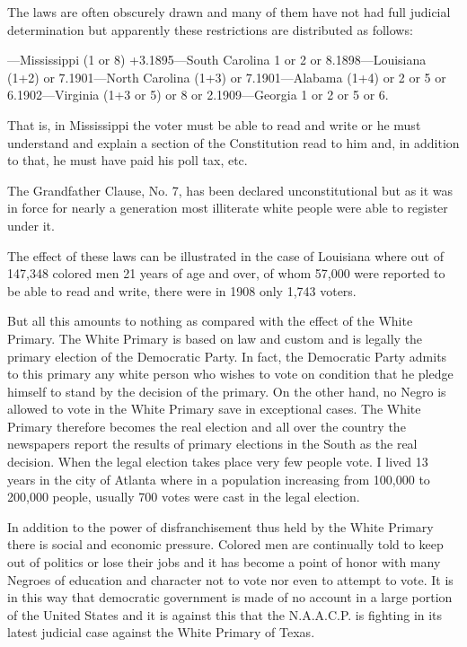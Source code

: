 \documentclass[letterpaper,10pt,english]{jupyterBook}
\begin{document}
\sphinxAtStartPar
The laws are often obscurely drawn and many of them have not had full judicial determination but apparently these restrictions are distributed as follows:

—Mississippi (1 or 8) +3.1895—South Carolina 1 or 2 or 8.1898—Louisiana (1+2) or 7.1901—North Carolina (1+3) or 7.1901—Alabama (1+4) or 2 or 5 or 6.1902—Virginia (1+3 or 5) or 8 or 2.1909—Georgia 1 or 2 or 5 or 6.

\sphinxAtStartPar
That is, in Mississippi the voter must be able to read and write or he must understand and explain a section of the Constitution read to him and, in addition to that, he must have paid his poll tax, etc.

\sphinxAtStartPar
The Grandfather Clause, No. 7, has been declared unconstitutional but as it was in force for nearly a generation most illiterate white people were able to register under it.

\sphinxAtStartPar
The effect of these laws can be illustrated in the case of Louisiana where out of 147,348 colored men 21 years of age and over, of whom 57,000 were reported to be able to read and write, there were in 1908 only 1,743 voters.

\sphinxAtStartPar
But all this amounts to nothing as compared with the effect of the White Primary. The White Primary is based on law and custom and is legally the primary election of the Democratic Party. In fact, the Democratic Party admits to this primary any white person who wishes to vote on condition that he pledge himself to stand by the decision of the primary. On the other hand, no Negro is allowed to vote in the White Primary save in exceptional cases. The White Primary therefore becomes the real election and all over the country the newspapers report the results of primary elections in the South as the real decision. When the legal election takes place very few people vote. I lived 13 years in the city of Atlanta where in a population increasing from 100,000 to 200,000 people, usually 700 votes were cast in the legal election.

\sphinxAtStartPar
In addition to the power of disfranchisement thus held by the White Primary there is social and economic pressure. Colored men are continually told to keep out of politics or lose their jobs and it has become a point of honor with many Negroes of education and character not to vote nor even to attempt to vote. It is in this way that democratic government is made of no account in a large portion of the United States and it is against this that the N.A.A.C.P. is fighting in its latest judicial case against the White Primary of Texas.
\end{document}
